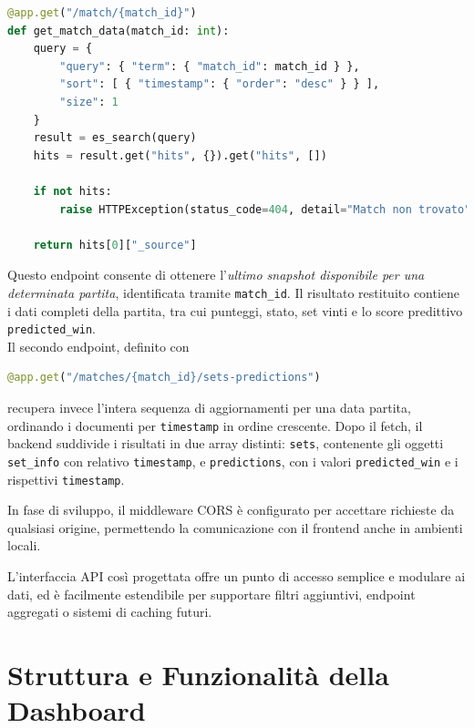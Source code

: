 \documentclass[a4paper,12pt]{report}
\begin{document}
\begin{lstlisting}[language=Python]
@app.get("/match/{match_id}")
def get_match_data(match_id: int):
    query = {
        "query": { "term": { "match_id": match_id } },
        "sort": [ { "timestamp": { "order": "desc" } } ],
        "size": 1
    }
    result = es_search(query)
    hits = result.get("hits", {}).get("hits", [])

    if not hits:
        raise HTTPException(status_code=404, detail="Match non trovato")

    return hits[0]["_source"]
\end{lstlisting}

Questo endpoint consente di ottenere l’\textit{ultimo snapshot disponibile per una determinata partita}, identificata tramite \texttt{match\_id}. Il risultato restituito contiene i dati completi della partita, tra cui punteggi, stato, set vinti e lo score predittivo \texttt{predicted\_win}.
\\

Il secondo endpoint, definito con

\begin{lstlisting}[language=Python]
@app.get("/matches/{match_id}/sets-predictions")
\end{lstlisting}

recupera invece l’intera sequenza di aggiornamenti per una data partita, ordinando i documenti per \texttt{timestamp} in ordine crescente. Dopo il fetch, il backend suddivide i risultati in due array distinti: \texttt{sets}, contenente gli oggetti \texttt{set\_info} con relativo \texttt{timestamp}, e \texttt{predictions}, con i valori \texttt{predicted\_win} e i rispettivi \texttt{timestamp}.


In fase di sviluppo, il middleware CORS è configurato per accettare richieste da qualsiasi origine, permettendo la comunicazione con il frontend anche in ambienti locali.

L’interfaccia API così progettata offre un punto di accesso semplice e modulare ai dati, ed è facilmente estendibile per supportare filtri aggiuntivi, endpoint aggregati o sistemi di caching futuri.


\section{Struttura e Funzionalità della Dashboard}
\end{document}
